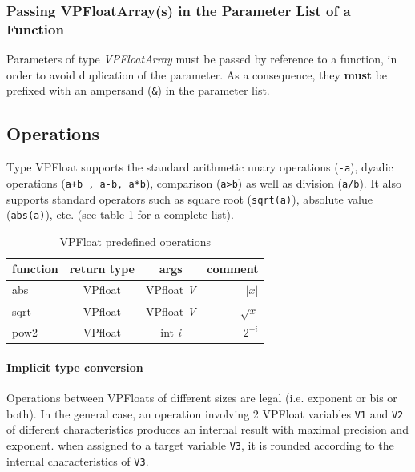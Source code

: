 \documentclass[11pt]{report}
\begin{document}
\subsubsection{Passing VPFloatArray(s) in the Parameter List of a Function}
Parameters of type \emph{VPFloatArray} must be passed by reference to a function, in order to avoid duplication of the parameter. As a consequence, they \textbf{must} be prefixed with an ampersand (\texttt{\&}) in the parameter list.


\subsection{Operations}
Type VPFloat supports the standard arithmetic unary operations (\texttt{-a}), dyadic operations (\texttt{a+b , a-b, a*b}), comparison (\texttt{a>b}) as well as division (\texttt{a/b}).
It also supports standard operators such as square root (\texttt{sqrt(a)}), absolute value (\texttt{abs(a)}), etc. (see table \ref{tab:table3} for a complete list).
\begin{table}[h!]
  \begin{center}
    \caption{VPFloat predefined operations}
    \label{tab:table3}
    \begin{tabular}{l|c|c|r} %
      \textbf{function} & \textbf{return type} & args & \textbf{comment}\\
      \hline
      abs & VPfloat & VPfloat \emph{V} & $|x|$ \\
      \hline
      sqrt & VPfloat & VPfloat \emph{V} & $\sqrt{x} $\\
      \hline
      pow2 & VPfloat & int \emph{i} & $2^{-i}$\\
      \hline
    \end{tabular}
  \end{center}
\end{table}

\paragraph{Implicit type conversion}
Operations between VPFloats of different sizes are legal (i.e.  exponent or bis or both). In the general case, an operation involving 2 VPFloat variables \texttt{V1} and \texttt{V2} of different characteristics produces an internal result with maximal precision and exponent. when assigned to a target variable \texttt{V3}, it is rounded according to the internal characteristics of \texttt{V3}.
\end{document}
